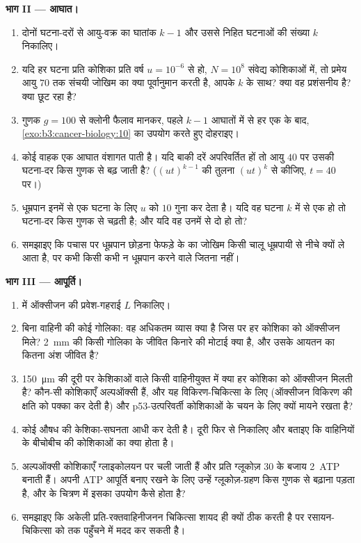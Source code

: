 \begin{problem}
\medskip
\noindent\textbf{भाग II --- आघात।}
\begin{enumerate}[resume]
  \item दोनों घटना-दरों से आयु-वक्र का घातांक $k - 1$ और उससे निहित
        घटनाओं की संख्या $k$ निकालिए।
  \item यदि हर घटना प्रति कोशिका प्रति वर्ष $u = 10^{-6}$ से हो,
        $N = 10^{8}$ संवेद्य कोशिकाओं में, तो प्रमेय आयु $70$ तक संचयी
        जोखिम का क्या पूर्वानुमान करती है, आपके $k$ के साथ? क्या वह
        प्रशंसनीय है? क्या छूट रहा है?
  \item गुणक $g = 100$ से क्लोनी फैलाव मानकर, पहले $k - 1$ आघातों में
        से हर एक के बाद,
        \cref{exo:b3:cancer-biology:10} का उपयोग करते हुए दोहराइए।
  \item कोई वाहक एक आघात वंशागत पाती है। यदि बाकी दरें अपरिवर्तित हों
        तो आयु $40$ पर उसकी घटना-दर किस गुणक से बढ़ जाती है?
        ($(ut)^{k-1}$ की तुलना $(ut)^{k}$ से कीजिए, $t = 40$ पर।)
  \item धूम्रपान इनमें से एक घटना के लिए $u$ को $10$ गुना कर देता है।
        यदि वह घटना $k$ में से एक हो तो घटना-दर किस गुणक से चढ़ती है;
        और यदि वह उनमें से दो हो तो?
  \item समझाइए कि पचास पर धूम्रपान छोड़ना फेफड़े के  का जोखिम किसी
        चालू धूम्रपायी से नीचे क्यों ले आता है, पर कभी किसी कभी न
        धूम्रपान करने वाले जितना नहीं।
\end{enumerate}

\medskip
\noindent\textbf{भाग III --- आपूर्ति।}
\begin{enumerate}[resume]
  \item {} में ऑक्सीजन की प्रवेश-गहराई $L$ निकालिए।
  \item बिना वाहिनी की कोई गोलिका: वह अधिकतम व्यास क्या है जिस पर हर
        कोशिका को ऑक्सीजन मिले? \qty{2}{mm} की किसी गोलिका के जीवित
        किनारे की मोटाई क्या है, और उसके आयतन का कितना अंश जीवित है?
  \item \qty{150}{\micro m} की दूरी पर केशिकाओं वाले किसी वाहिनीयुक्त
         में क्या हर कोशिका को ऑक्सीजन मिलती है? कौन-सी कोशिकाएँ
        अल्पऑक्सी हैं, और यह विकिरण-चिकित्सा के लिए (ऑक्सीजन विकिरण की
        क्षति को पक्का कर देती है) और p53-उत्परिवर्ती कोशिकाओं के चयन
        के लिए क्यों मायने रखता है?
  \item कोई औषध  की केशिका-सघनता आधी कर देती है। दूरी फिर से
        निकालिए और बताइए कि वाहिनियों के बीचोबीच की कोशिकाओं का क्या
        होता है।
  \item अल्पऑक्सी कोशिकाएँ ग्लाइकोलयन पर चली जाती हैं और प्रति
        ग्लूकोज़ $30$ के बजाय \qty{2}{ATP} बनाती हैं। अपनी ATP आपूर्ति
        बनाए रखने के लिए उन्हें ग्लूकोज़-ग्रहण किस गुणक से बढ़ाना पड़ता
        है, और  के चित्रण में इसका उपयोग कैसे होता है?
  \item समझाइए कि अकेली प्रति-रक्तवाहिनीजनन चिकित्सा शायद ही क्यों ठीक
        करती है पर रसायन-चिकित्सा को  तक पहुँचने में मदद कर सकती है।
\end{enumerate}


\end{problem}
